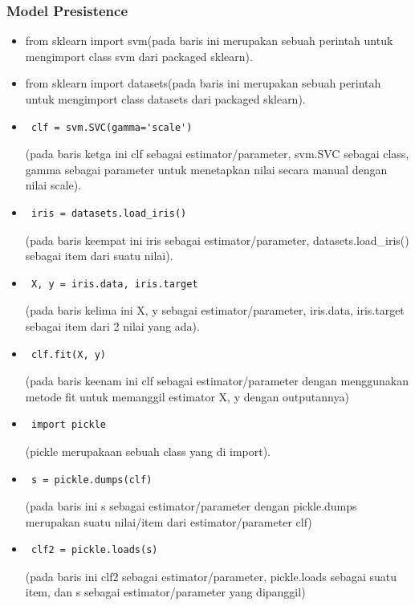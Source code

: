 \subsubsection{Model Presistence}
\begin{itemize}
\item from sklearn import svm(pada baris ini merupakan sebuah perintah untuk mengimport class svm dari packaged sklearn).
\item from sklearn import datasets(pada baris ini merupakan sebuah perintah untuk mengimport class datasets dari packaged sklearn).
\item\begin{verbatim} clf = svm.SVC(gamma='scale')\end{verbatim}(pada baris ketga ini clf sebagai estimator/parameter, svm.SVC sebagai class, gamma sebagai parameter untuk menetapkan nilai secara manual dengan nilai scale).
\item\begin{verbatim} iris = datasets.load_iris()\end{verbatim}(pada baris keempat ini iris sebagai estimator/parameter, datasets.load\_iris() sebagai item dari suatu nilai).
\item\begin{verbatim} X, y = iris.data, iris.target\end{verbatim}(pada baris kelima ini X, y sebagai estimator/parameter, iris.data, iris.target sebagai item dari 2 nilai yang ada).
\item\begin{verbatim} clf.fit(X, y)\end{verbatim}(pada baris keenam ini clf sebagai estimator/parameter dengan menggunakan metode fit untuk memanggil estimator X, y dengan outputannya) 
\item\begin{verbatim} import pickle\end{verbatim}(pickle merupakaan sebuah class yang di import).
\item\begin{verbatim} s = pickle.dumps(clf)\end{verbatim}(pada baris ini s sebagai estimator/parameter dengan pickle.dumps merupakan suatu nilai/item dari estimator/parameter clf)
\item\begin{verbatim} clf2 = pickle.loads(s)\end{verbatim}(pada baris ini clf2 sebagai estimator/parameter, pickle.loads sebagai suatu item, dan s sebagai estimator/parameter yang dipanggil) 

\end{itemize}

